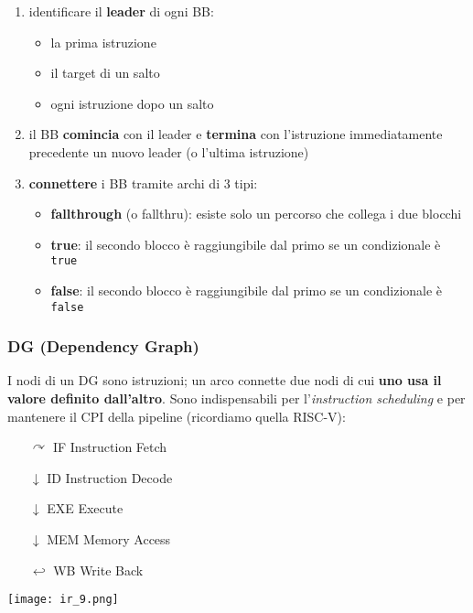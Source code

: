 \begin{enumerate}
  \item identificare il \textbf{leader} di ogni BB:
    \begin{itemize}
      \item la prima istruzione
      \item il target di un salto
      \item ogni istruzione dopo un salto
    \end{itemize}
  \item il BB \textbf{comincia} con il leader e \textbf{termina} con l'istruzione immediatamente precedente un nuovo leader (o l'ultima istruzione)
  \item \textbf{connettere} i BB tramite archi di 3 tipi:
    \begin{itemize}
      \item \textbf{fallthrough} (o fallthru): esiste solo un percorso che collega i due blocchi
      \item \textbf{true}: il secondo blocco \`e raggiungibile dal primo se un condizionale \`e \lstinline|true|
      \item \textbf{false}: il secondo blocco \`e raggiungibile dal primo se un condizionale \`e \lstinline|false|
    \end{itemize}
\end{enumerate}

\subsubsection{DG (Dependency Graph)}

I nodi di un DG sono istruzioni; un arco connette due nodi di cui \textbf{uno usa il valore definito dall'altro}. Sono indispensabili per l'\textit{instruction scheduling} e per mantenere il CPI della pipeline (ricordiamo quella RISC-V):\\

\noindent\begin{minipage}[c]{.6\textwidth}
\begin{itemize}
  \item[$\curvearrowright$] IF Instruction Fetch
  \item[$\downarrow$] ID Instruction Decode
  \item[$\downarrow$] EXE Execute
  \item[$\downarrow$] MEM Memory Access
  \item[$\hookleftarrow$] WB Write Back
\end{itemize}
\end{minipage}
\begin{minipage}[c]{.4\textwidth}
  \centering
\texttt{[image: ir\_9.png]}
\end{minipage}\\

